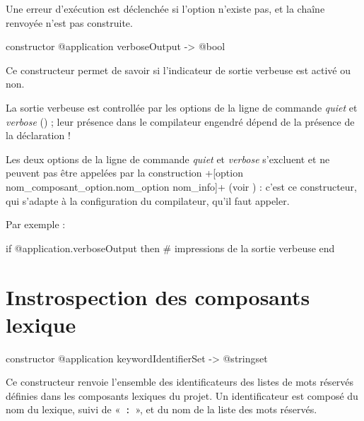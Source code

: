 Une erreur d'exécution est déclenchée si l'option n'existe pas, et la chaîne renvoyée n'est pas construite.


\begin{galgasbox}
constructor @application verboseOutput -> @bool
\end{galgasbox}

Ce constructeur permet de savoir si l'indicateur de sortie verbeuse est activé ou non.

La sortie verbeuse est controllée par les options de la ligne de commande \emph{quiet} et \emph{verbose} () ; leur présence dans le compilateur engendré dépend de la présence de la déclaration \ggs!%

Les deux options de la ligne de commande \emph{quiet} et \emph{verbose} s'excluent et ne peuvent pas être appelées par la construction \ggs+[option nom_composant_option.nom_option nom_info]+ (voir ) : c'est ce constructeur, qui s'adapte à la configuration du compilateur, qu'il faut appeler.

Par exemple :
\begin{galgas}
if @application.verboseOutput then
  # impressions de la sortie verbeuse
end
\end{galgas}














\section{Instrospection des composants lexique}


\begin{galgasbox}
constructor @application keywordIdentifierSet -> @stringset
\end{galgasbox}


Ce constructeur renvoie l'ensemble des identificateurs des listes de mots réservés définies dans les composants lexiques du projet. Un identificateur est composé du nom du lexique, suivi de «~\texttt{:}~», et du nom de la liste des mots réservés.


